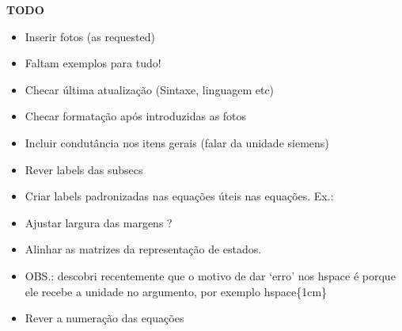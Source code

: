 \documentclass{article}
\numberwithin{equation}{section}
\begin{document}
    \begin{center}{\textbf{\Large TODO}}\end{center}
    \begin{itemize}
        \item Inserir fotos (as requested) %
        \item Faltam exemplos para tudo!
        \item Checar última atualização (Sintaxe, linguagem etc)
        \item Checar formatação após introduzidas as fotos
        \item Incluir condutância nos itens gerais (falar da unidade siemens)
        \item Rever labels das subsecs
        \item Criar labels padronizadas nas equações úteis nas equações. Ex.: %
        \item Ajustar largura das margens ?
        \item Alinhar as matrizes da representação de estados.
        \item OBS.: descobri recentemente que o motivo de dar `erro' nos hspace é porque ele recebe a unidade no argumento, por exemplo hspace\{1cm\}
        \item Rever a numeração das equações
    \end{itemize}
\end{document}

